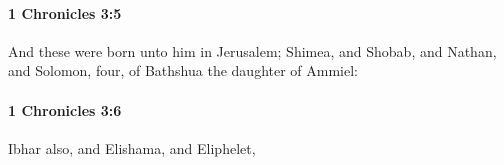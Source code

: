 		\paragraph{1 Chronicles 3:5} %
			\label{1CHRONICLES-3-5}

			And these were born unto him in Jerusalem; Shimea, and Shobab, and Nathan, and Solomon, four, of Bathshua the daughter of Ammiel:


		\paragraph{1 Chronicles 3:6} %
			\label{1CHRONICLES-3-6}

			Ibhar also, and Elishama, and Eliphelet,


